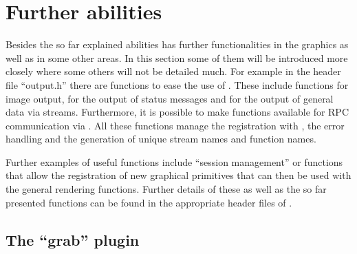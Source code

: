 \section{Further abilities}

Besides the so far explained abilities \icewing{} has further
functionalities in the graphics as well as in some other areas. In
this section some of them will be introduced more closely where some
others will not be detailed much. For example in the header file
``output.h'' there are functions to ease the use of \dacs{}. These
include functions for image output, for the output of status
messages and for the output of general data via
streams. Furthermore, it is possible to make functions available for
RPC communication via \dacs{}. All these functions manage the
registration with \dacs{}, the error handling and the generation of
unique stream names and function names.

Further examples of useful functions include ``session management'' or
functions that allow the registration of new graphical primitives
that can then be used with the general rendering functions. Further
details of these as well as the so far presented functions can be found in
the appropriate header files of \icewing{}.

\subsection{The ``grab'' plugin}

